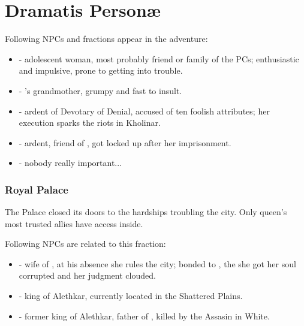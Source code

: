 \section{Dramatis Person\ae}
\label{personae}

Following NPCs and fractions appear in the adventure:

\begin{itemize}
	\item \npcTroublemaker[s]{} - adolescent woman, most probably friend or family of the PCs; enthusiastic and impulsive, prone to getting into trouble.
	
	\item \npcGrandma[s]{} - \npcTroublemaker{}'s grandmother, grumpy and fast to insult.
	
	\item \npcRebelArdent[s]{} - ardent of Devotary of Denial, accused \npcQueen{} of ten foolish attributes; her execution sparks the riots in Kholinar.
	
	\item \npcLockedArdent[s]{} - ardent, friend of \npcRebelArdent{}, got locked up after her imprisonment.
	
	\item \npcHoid[s]{} - nobody really important...
\end{itemize}



\subsubsection{Royal Palace}

The Palace closed its doors to the hardships troubling the city. Only queen's most trusted allies have access inside.

Following NPCs are related to this fraction:

\begin{itemize}
	\item \npcQueen[s]{} - wife of \npcElhokar{}, at his absence she rules the city; bonded to \npcYeligNar{}, the \npcYeligNarTitle{} she got her soul corrupted and her judgment clouded.
	
	\item \npcElhokar[s]{} - king of Alethkar, currently located in the Shattered Plains.
	
	\item \npcDeadKing[s]{} - former king of Alethkar, father of \npcElhokar{}, killed by the Assasin in White.
\end{itemize}



